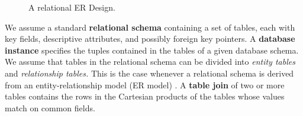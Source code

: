 \documentclass{acm_proc_article-sp}
\begin{document}

\begin{figure}[htbp] %
 \centering
{} 
\caption{A relational ER Design.}
 \label{fig:university-schema}
\end{figure}
 We assume a standard \textbf{relational schema} containing a set of tables, each with key fields, %
descriptive attributes, and possibly foreign key pointers. 
A \textbf{database instance} specifies the tuples contained in the tables of a given database schema. 
We assume that tables in the relational schema can be divided into {\em entity tables} and {\em relationship tables.} 
This is the case whenever a relational schema is derived from an entity-relationship model (ER model) \cite[Ch.2.2]{Ullman1982}. A \textbf{table join} of two or more tables contains the rows in the Cartesian products of the tables whose values match on common fields.
\end{document}
